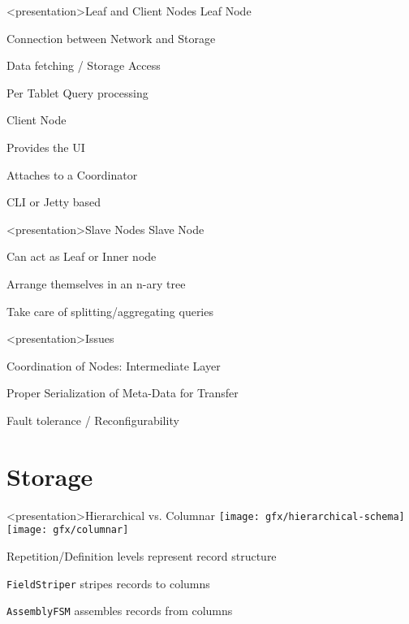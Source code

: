 \begin{frame}<presentation>{Leaf and Client Nodes}
  Leaf Node
  \begin{niitemize}
    \item Connection between Network and Storage
    \item Data fetching / Storage Access
    \item Per Tablet Query processing
  \end{niitemize}
  Client Node
  \begin{niitemize}
    \item Provides the UI
    \item Attaches to a Coordinator
    \item CLI or Jetty based
  \end{niitemize}
\end{frame}

\begin{frame}<presentation>{Slave Nodes}
  Slave Node
  \begin{niitemize}
    \item Can act as Leaf or Inner node
    \item Arrange themselves in an n-ary tree
    \item Take care of splitting/aggregating queries
  \end{niitemize}
\end{frame}

\begin{frame}<presentation>{Issues}
  \begin{niitemize}
   \item Coordination of Nodes: Intermediate Layer
   \item Proper Serialization of Meta-Data for Transfer
   \item Fault tolerance / Reconfigurability
  \end{niitemize}
\end{frame}



\section{Storage}

\begin{frame}<presentation>{Hierarchical vs. Columnar}
\texttt{[image: gfx/hierarchical-schema]}
\hfill
\texttt{[image: gfx/columnar]}

\begin{niitemize}
 \item Repetition/Definition levels represent record structure
 \item \texttt{FieldStriper} stripes records to columns
 \item \texttt{AssemblyFSM} assembles records from columns
\end{niitemize}
\end{frame}

